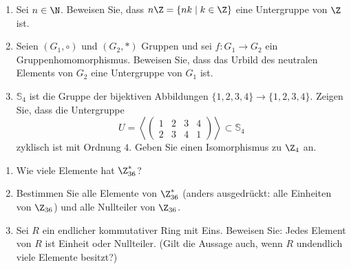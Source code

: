 \documentclass[german]{mhexsheet}
\begin{document}
\maketitle

\inclass
\begin{exercise}[title = Gruppen]
 \begin{enumerate}
  \item Sei $n \in \N$. Beweisen Sie, dass $n\Z = \{nk \mid k \in \Z\}$ eine Untergruppe von $\Z$ ist.
   \item Seien $(G_1, \circ)$ und $(G_2, *)$ Gruppen und sei $f: G_1 \rightarrow G_2$ ein Gruppenhomomorphismus. Beweisen Sie, dass das Urbild des neutralen Elements von $G_2$ eine Untergruppe von $G_1$ ist. 
  \item $\mathbb S_4$ ist die Gruppe der bijektiven Abbildungen $\{1, 2, 3, 4\} \rightarrow \{1, 2, 3, 4\}$. Zeigen Sie, dass die Untergruppe
  \[U = \left\langle \begin{pmatrix} 1 & 2 & 3 & 4 \\ 2 & 3 & 4 & 1 \end{pmatrix} \right\rangle \subset \mathbb S_4\] 
  zyklisch ist mit Ordnung $4$. Geben Sie einen Isomorphismus zu $\Z_4$ an.
 \end{enumerate}
\end{exercise}


\begin{exercise}[title = Teilbarkeit]
 \begin{enumerate}
  \item Wie viele Elemente hat $\Z_{36}^*$?
  \item Bestimmen Sie alle Elemente von $\Z_{36}^*$ (anders ausgedrückt: alle Einheiten von $\Z_{36}$) und alle Nullteiler von $\Z_{36}$.
  \item Sei $R$ ein endlicher kommutativer Ring mit Eins. Beweisen Sie: Jedes Element von $R$ ist Einheit oder Nullteiler. (Gilt die Aussage auch, wenn $R$ undendlich viele Elemente besitzt?) 
 \end{enumerate}
\end{exercise}
\end{document}
